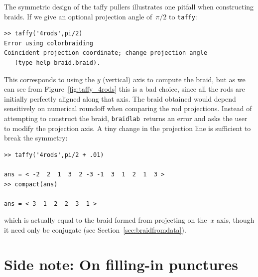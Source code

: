 \documentclass[12pt]{article}
\newcommand{\braidlab}{\texttt{braidlab}}%
\begin{document}
The symmetric design of the taffy pullers illustrates one pitfall when
constructing braids.  If we give an optional projection angle %
%
of~$\pi/2$ to \lstinline{taffy}:
\begin{lstlisting}[frame=single,framerule=0pt]
>> taffy('4rods',pi/2)
Error using colorbraiding
Coincident projection coordinate; change projection angle
   (type help braid.braid).
\end{lstlisting}
This corresponds to using the $y$ (vertical) axis to compute the braid, but as
we can see from Figure~\ref{fig:taffy_4rods} this is a bad choice, since all
the rods are initially perfectly aligned along that axis.  The braid obtained
would depend sensitively on numerical roundoff when comparing the rod
projections.  Instead of attempting to construct the braid, \braidlab\ returns
an error and asks the user to modify the projection axis.  A tiny change in
the projection line is sufficient to break the symmetry:
\begin{lstlisting}[frame=single,framerule=0pt]
>> taffy('4rods',pi/2 + .01)

ans = < -2  2  1  3  2 -3 -1  3  1  2  1  3 >
>> compact(ans)

ans = < 3  1  2  2  3  1 >
\end{lstlisting}
%
which is actually equal to the braid formed from projecting on the~$x$ axis,
though it need only be conjugate %
%
(see Section~\ref{sec:braidfromdata}). %
%



\section{Side note: On filling-in punctures}

\end{document}
